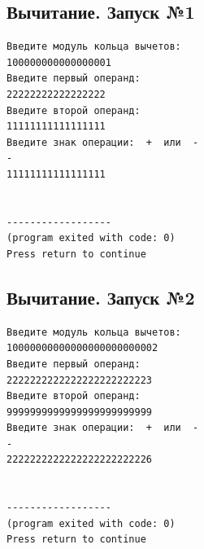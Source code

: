 \documentclass[a4paper,12pt]{article} %
\begin{document}
\subsection*{Вычитание. Запуск №1}
\begin{verbatim}
Введите модуль кольца вычетов:
100000000000000001
Введите первый операнд:
22222222222222222
Введите второй операнд:
11111111111111111
Введите знак операции:  +  или  -
-
11111111111111111


------------------
(program exited with code: 0)
Press return to continue
\end{verbatim}

\subsection*{Вычитание. Запуск №2}
\begin{verbatim}
Введите модуль кольца вычетов:
10000000000000000000000002
Введите первый операнд:
2222222222222222222222223
Введите второй операнд:
9999999999999999999999999
Введите знак операции:  +  или  -
-
2222222222222222222222226


------------------
(program exited with code: 0)
Press return to continue
\end{verbatim}

\printbibliography
\end{document}
